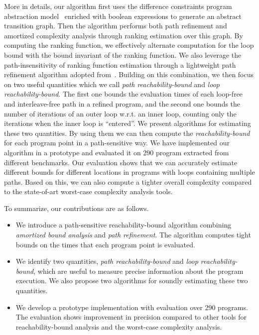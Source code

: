 More in details, our algorithm first uses the difference constraints program abstraction model~\cite{SinnZV17,SinnZV14} enriched with boolean expressions to generate an abstract transition graph.
Then the algorithm performs both path refinement and amortized complexity analysis through ranking estimation over this graph.
By computing the ranking function, we effectively alternate computation for the loop bound with the bound invariant of the ranking function. 
We also leverage the path-insensitivity of ranking function estimation through a lightweight path refinement algorithm adopted from~\cite{GulwaniJK09}.
Building on this combination, we then focus on two useful quantities which we call \emph{path reachability-bound} and \emph{loop reachability-bound}.
The first one bounds the evaluation times of each loop-free and interleave-free path in a refined program, and the second one bounds the number of iterations of an outer loop w.r.t. an inner loop, counting only the iterations when the inner loop is ``entered''. 
We present algorithms for estimating these two quantities. By using them we can then 
compute the \emph{reachability-bound} for each program point in a path-sensitive way.
We have implemented our algorithm in a prototype and evaluated it on 290 program extracted from different benchmarks. Our evaluation %
shows that we can accurately estimate different bounds for different locations in programs with loops containing multiple paths. Based on this, we can also compute a tighter overall complexity compared to the state-of-art worst-case complexity analysis tools.

To summarize, our contributions are as follows.
\begin{itemize}
\item We introduce a path-sensitive reachability-bound algorithm 
combining \emph{amortized bound analysis}  and \emph{path refinement}. The algorithm computes tight bounds on the times that each program point is evaluated.

\item 
 We identify two quantities,  \emph{path reachability-bound} and \emph{loop reachability-bound}, which are useful to measure precise information about the program execution.  We also propose two algorithms for soundly estimating these two quantities.
\item 
 We develop a prototype implementation with evaluation over 290 programs.
 The evaluation shows improvement in precision compared to other tools for reachability-bound analysis and the worst-case complexity analysis.
\end{itemize}

